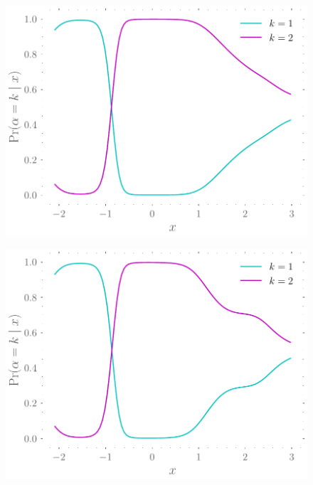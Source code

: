 \documentclass{mimosis-class/mimosis}
\numberwithin{equation}{chapter}
\newcommand{\modeInd}{\ensuremath{k}}
\newcommand{\ModeInd}{\ensuremath{\MakeUppercase{\modeInd}}}
\begin{document}
{\begin{figure}[hbt!]
\begin{minipage}[r]{0.49\textwidth}
\label{fig-gating-gps-mcycle-two-experts-further}
\end{minipage}
\begin{minipage}[r]{0.49\textwidth}
\centering
\includegraphics[width=\textwidth]{./images/model/mcycle/K=2_L2/gating_mixing_probs.pdf}
\label{fig-mixing-probs-mcycle-two-experts-tight}
\end{minipage}
\begin{minipage}[r]{0.49\textwidth}
\centering
\includegraphics[width=\textwidth]{./images/model/mcycle/K=2_L3/gating_mixing_probs.pdf}

\end{minipage}
\end{figure}}
\end{document}
